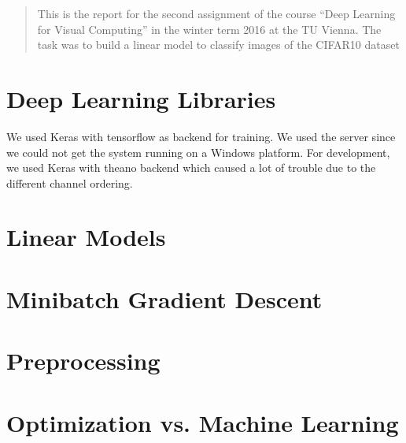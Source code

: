 \newcommand{\ttitle}{Image Classification using Linear Models and CNN \TODO}
\hyphenation{}
\maketitle
{}

\begin{abstract}
This is the report for the second assignment of the course ``Deep Learning for Visual Computing'' in the winter term 2016 at the TU Vienna. The task was to build a linear model to classify images of  the CIFAR10 dataset \TODO
\end{abstract}


\section{Deep Learning Libraries}
We used Keras with tensorflow as backend for training. We used the server since we could not get the system running on a Windows platform. For development, we used Keras with theano backend which caused a lot of trouble due to the different channel ordering.


\section{Linear Models}

\section{Minibatch Gradient Descent}

\section{Preprocessing}

\section{Optimization vs. Machine Learning}

